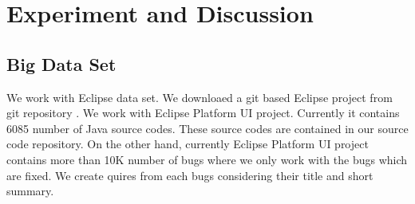 \documentclass{sig-alternate}
\begin{document}

\section{Experiment and Discussion}
\subsection {Big Data Set}
We work with Eclipse data set. We downloaed a git based Eclipse project from git repository \cite{eclipseGit}. We work with Eclipse Platform UI project. Currently it contains 6085 number of Java source codes. These source codes are contained in our source code repository. On the other hand, currently Eclipse Platform UI project contains more than 10K number of bugs where we only work with the bugs which are fixed. We create quires from each bugs considering their title and short summary.

\begin{table}[!t]
\caption{Description of Data Sets}
\label{tab:DDSl}
\centering
{}
\end{table}
\end{document}
